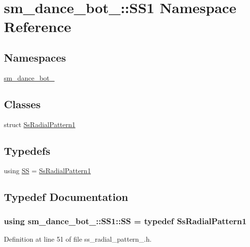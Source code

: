 \hypertarget{namespacesm__dance__bot__3_1_1SS1}{}\section{sm\+\_\+dance\+\_\+bot\+\_\+:\+:S\+S1 Namespace Reference}
\label{namespacesm__dance__bot__3_1_1SS1}
\subsection*{Namespaces}
\begin{DoxyCompactItemize}
\item 
 \hyperlink{namespacesm__dance__bot__3_1_1SS1_1_1sm__dance__bot__3}{sm\+\_\+dance\+\_\+bot\+\_}
\end{DoxyCompactItemize}
\subsection*{Classes}
\begin{DoxyCompactItemize}
\item 
struct \hyperlink{structsm__dance__bot__3_1_1SS1_1_1SsRadialPattern1}{Ss\+Radial\+Pattern1}
\end{DoxyCompactItemize}
\subsection*{Typedefs}
\begin{DoxyCompactItemize}
\item 
using \hyperlink{namespacesm__dance__bot__3_1_1SS1_aa6a573d7866d8b69696b0c840eadc8fc}{SS} = \hyperlink{structsm__dance__bot__3_1_1SS1_1_1SsRadialPattern1}{Ss\+Radial\+Pattern1}
\end{DoxyCompactItemize}


\subsection{Typedef Documentation}
\subsubsection[{\texorpdfstring{SS}{SS}}]{\setlength{\rightskip}{0pt plus 5cm}using {\bf sm\+\_\+dance\+\_\+bot\+\_\+::\+S\+S1\+::\+SS} = typedef {\bf Ss\+Radial\+Pattern1}}\hypertarget{namespacesm__dance__bot__3_1_1SS1_aa6a573d7866d8b69696b0c840eadc8fc}{}\label{namespacesm__dance__bot__3_1_1SS1_aa6a573d7866d8b69696b0c840eadc8fc}


Definition at line 51 of file ss\+\_\+radial\+\_\+pattern\+\_.\+h.

